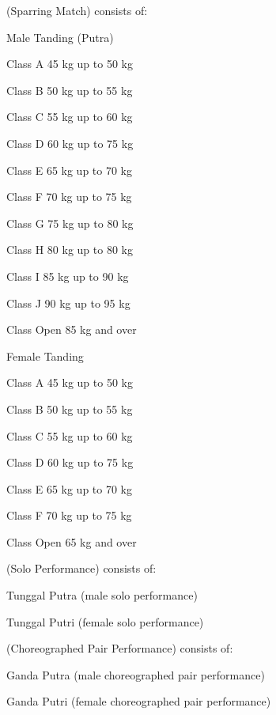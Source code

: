 \begin{legal}
\item {} (Sparring Match) consists of:
    \begin{legal}
    \item Male Tanding (Putra)
        \begin{legal}
        \item Class A 45 kg up to 50 kg
        \item Class B 50 kg up to 55 kg
        \item Class C 55 kg up to 60 kg
        \item Class D 60 kg up to 75 kg
        \item Class E 65 kg up to 70 kg
        \item Class F 70 kg up to 75 kg
        \item Class G 75 kg up to 80 kg
        \item Class H 80 kg up to 80 kg
        \item Class I 85 kg up to 90 kg
        \item Class J 90 kg up to 95 kg
        \item Class Open 85 kg and over
        \end{legal}
    \item Female Tanding
        \begin{legal}
        \item Class A 45 kg up to 50 kg
        \item Class B 50 kg up to 55 kg
        \item Class C 55 kg up to 60 kg
        \item Class D 60 kg up to 75 kg
        \item Class E 65 kg up to 70 kg
        \item Class F 70 kg up to 75 kg
        \item Class Open 65 kg and over
        \end{legal}
    \item {} (Solo Performance) consists of:
        \begin{legal}
        \item Tunggal Putra (male solo performance)
        \item Tunggal Putri (female solo performance)
        \end{legal}

    \item {} (Choreographed Pair Performance) consists of:
        \begin{legal}
        \item Ganda Putra (male choreographed pair performance)
        \item Ganda Putri (female choreographed pair performance)
        \end{legal}


\end{legal}
\end{legal}
